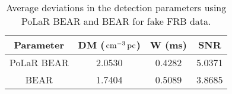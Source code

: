 \begin{table}
\centering
\def\arraystretch{1.25}
\caption[Average deviations in the detection parameters for fake FRB data]{Average deviations in the detection parameters using PoLaR BEAR and BEAR for fake FRB data.}
\begin{tabular}{cccc}
\hline
Parameter & DM ($\,\text{cm}^{-3}\,\text{pc}$) & W (ms) & SNR\\
\hline
PoLaR BEAR & 2.0530   & 0.4282  & 5.0371 \\
BEAR       & 1.7404   & 0.5089  & 3.8685  \\
\hline
\end{tabular}
\label{tab:fakedev}
\end{table}